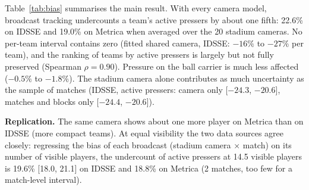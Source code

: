 \documentclass[runningheads]{llncs}
\begin{document}
\begin{table}[t]
\centering
\caption{Relative bias of pressing metrics under different cameras (negative = undercount). 95\% block-bootstrap
intervals; the stadium ensemble interval includes camera, match and within-match variation.}
\label{tab:bias}
\end{table}

Table~\ref{tab:bias} summarises the main result. With every camera model, broadcast tracking undercounts a team's
active pressers by about one fifth: 22.6\% on IDSSE and 19.0\% on Metrica when averaged over the 20 stadium cameras.
No per-team interval contains zero (fitted shared camera, IDSSE: $-16\%$ to $-27\%$ per team), and the ranking of
teams by active pressers is largely but not fully preserved (Spearman $\rho = 0.90$). Pressure on the ball carrier is much
less affected ($-0.5\%$ to $-1.8\%$). The stadium camera alone contributes as much uncertainty as the sample of matches
(IDSSE, active pressers: camera only [$-24.3$, $-20.6$], matches and blocks only [$-24.4$, $-20.6$]).

\textbf{Replication.} The same camera shows about one more player on Metrica than on IDSSE (more compact teams).
At equal visibility the two data sources agree closely: regressing the bias of each broadcast (stadium camera
$\times$ match) on its number of visible players, the undercount of active pressers at 14.5 visible players is
19.6\% [18.0, 21.1] on IDSSE and 18.8\% on Metrica (2 matches, too few for a match-level interval).
\end{document}
